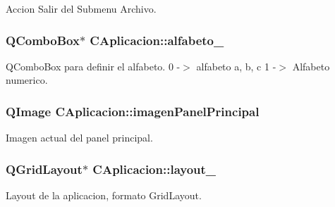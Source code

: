 Accion Salir del Submenu Archivo. 

\subsubsection[{\texorpdfstring{alfabeto\+\_\+}{alfabeto_}}]{\setlength{\rightskip}{0pt plus 5cm}Q\+Combo\+Box$\ast$ C\+Aplicacion\+::alfabeto\+\_\+\hspace{0.3cm}{\ttfamily [private]}}\hypertarget{classCAplicacion_a2bc2fca932b919c027f2c4a35f837de0}{}\label{classCAplicacion_a2bc2fca932b919c027f2c4a35f837de0}


Q\+Combo\+Box para definir el alfabeto. 0 -\/$>$ alfabeto a, b, c 1 -\/$>$ Alfabeto numerico. 

\subsubsection[{\texorpdfstring{imagen\+Panel\+Principal}{imagenPanelPrincipal}}]{\setlength{\rightskip}{0pt plus 5cm}Q\+Image C\+Aplicacion\+::imagen\+Panel\+Principal\hspace{0.3cm}{\ttfamily [private]}}\hypertarget{classCAplicacion_a0d02a7838c0974bffc76e8dd08848dc9}{}\label{classCAplicacion_a0d02a7838c0974bffc76e8dd08848dc9}


Imagen actual del panel principal. 

\subsubsection[{\texorpdfstring{layout\+\_\+}{layout_}}]{\setlength{\rightskip}{0pt plus 5cm}Q\+Grid\+Layout$\ast$ C\+Aplicacion\+::layout\+\_\+\hspace{0.3cm}{\ttfamily [private]}}\hypertarget{classCAplicacion_a135b700bb291de086b00bcc4481ffc8b}{}\label{classCAplicacion_a135b700bb291de086b00bcc4481ffc8b}


Layout de la aplicacion, formato Grid\+Layout. 

